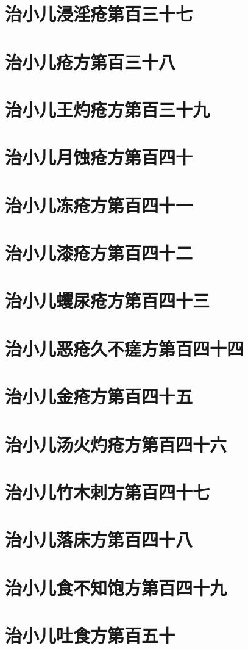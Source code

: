 \documentclass[a4paper,12pt,UTF8,twoside]{ctexbook}
\begin{document}
\chapter{治小儿浸淫疮第百三十七}
\chapter{治小儿疮方第百三十八}
\chapter{治小儿王灼疮方第百三十九}
\chapter{治小儿月蚀疮方第百四十}
\chapter{治小儿冻疮方第百四十一}
\chapter{治小儿漆疮方第百四十二}
\chapter{治小儿蠼尿疮方第百四十三}
\chapter{治小儿恶疮久不瘥方第百四十四}
\chapter{治小儿金疮方第百四十五}
\chapter{治小儿汤火灼疮方第百四十六}
\chapter{治小儿竹木刺方第百四十七}
\chapter{治小儿落床方第百四十八}
\chapter{治小儿食不知饱方第百四十九}
\chapter{治小儿吐食方第百五十}
\end{document}
